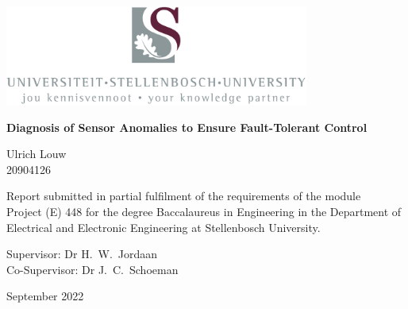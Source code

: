 \graphicspath{{frontmatter/fig/}}

\begin{titlepage}
	\begin{center}
		
		\includegraphics[width=10cm]{USlogo-top}
		
		\vfill
		
		{\sffamily \bfseries \huge Diagnosis of Sensor Anomalies to Ensure Fault-Tolerant Control \par}
		
		\vfill
		
		{\large {\Large Ulrich Louw} \\ 20904126 \par}
		
		\vfill
		
		\vfill
		
		{Report submitted in partial fulfilment of the requirements of the module \\
			Project (E) 448 for the degree Baccalaureus in Engineering in the Department of
			Electrical and Electronic Engineering at Stellenbosch University. \par}
		
		\vfill
		
		{\large {Supervisor}: Dr H.\ W.\ Jordaan} \\
		
		{\large {Co-Supervisor}: Dr J.\ C.\ Schoeman}
		
		\vfill
		
		{\Large September 2022}
	\end{center}
\end{titlepage}
